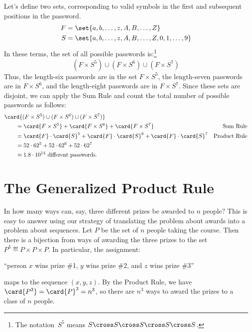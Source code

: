 Let's define two sets, corresponding to valid symbols in the first and
subsequent positions in the password.
%
\begin{align*}
F & = \set{ a, b, \ldots, z, A, B, \ldots, Z } \\
S & = \set{ a, b, \ldots, z, A, B, \ldots, Z, 0, 1, \ldots, 9 }
\end{align*}
%
In these terms, the set of all possible passwords is:\footnote{The
  notation~$S^5$ means $S \cross S \cross S \cross S \cross S$.}
%
\[
(F \times S^5) \cup (F \times S^6) \cup (F \times S^7)
\]
%
Thus, the length-six passwords are in the set $F \times S^5$, the
length-seven passwords are in $F \times S^6$, and the length-eight
passwords are in $F \times S^7$.  Since these sets are disjoint, we
can apply the Sum Rule and count the total number of possible
passwords as follows:
%
\begin{align*}
\lefteqn{\card{(F \times S^5) \cup (F \times S^6) \cup (F \times S^7)}}
\qquad & \\
    & = \card{F \times S^5} + \card{F \times S^6} + \card{F \times S^7}
        & \text{Sum Rule} \\
    & = \card{F} \cdot \card{S}^5 +
          \card{F} \cdot \card{S}^6 +
          \card{F} \cdot \card{S}^7
        & \text{Product Rule} \\
    & = 52 \cdot 62^5 + 52 \cdot 62^6 + 52 \cdot 62^7 \\
    & \approx 1.8 \cdot 10^{14} \text{ different passwords}.
\end{align*}



\begin{problems}
\practiceproblems
{}

\classproblems
{}

\homeworkproblems
{}
\end{problems}

\section{The Generalized Product Rule}\label{generalized_product_sec}

In how many ways can, say, three different prizes be awarded to $n$
people?  This is easy to answer using our strategy of translating the
problem about awards into a problem about sequences.  Let $P$ be the
set of $n$ people taking the course.  Then there is a bijection from
ways of awarding the three prizes to the set $P^3 \eqdef P \times P
\times P$.  In particular, the assignment:
%
\begin{center}
``person $x$ wins prize \#1, $y$ wins prize \#2, and $z$ wins prize \#3''
\end{center}
%
maps to the sequence $(x, y, z)$.  By the Product Rule, we have
$\card{P^3}= \card{P}^3 = n^3$, so there are $n^3$ ways to award the
prizes to a class of $n$ people.


